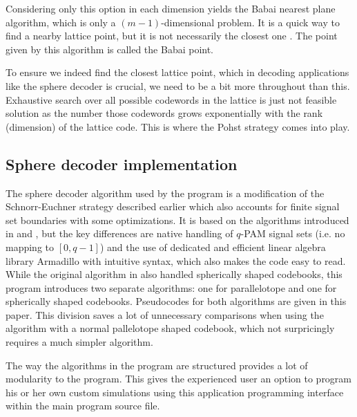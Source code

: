 \documentclass[english,12pt,a4paper,pdftex,sci,utf8]{aaltothesis}
\begin{document}
Considering only this option in each dimension yields the Babai nearest plane algorithm, which is only a $(m-1)$-dimensional problem. It is a quick way to find a nearby lattice point, but it is not necessarily the closest one \cite{agrell}. The point given by this algorithm is called the Babai point.
\par To ensure we indeed find the closest lattice point, which in decoding applications like the sphere decoder is crucial, we need to be a bit more throughout than this. Exhaustive search over all possible codewords in the lattice is just not feasible solution as the number those codewords grows exponentially with the rank (dimension) of the lattice code. This is where the Pohst strategy comes into play.

\subsection{Sphere decoder implementation}
The sphere decoder algorithm used by the program is a modification of the Schnorr-Euchner strategy described earlier which also accounts for finite signal set boundaries with some optimizations. It is based on the algorithms introduced in \cite{mia} and \cite{ranto}, but the key differences are native handling of $q$-PAM signal sets (i.e. no mapping to $[0,q-1]$) and the use of dedicated and efficient linear algebra library Armadillo \cite{arma} with intuitive syntax, which also makes the code easy to read. While the original algorithm in \cite{ranto} also handled spherically shaped codebooks, this program introduces two separate algorithms: one for parallelotope and one for spherically shaped codebooks. Pseudocodes for both algorithms are given in this paper. This division saves a lot of unnecessary comparisons when using the algorithm with a normal pallelotope shaped codebook, which not surpricingly requires a much simpler algorithm. 
\par The way the algorithms in the program are structured provides a lot of modularity to the program. This gives the experienced user an option to program his or her own custom simulations using this application programming interface within the main program source file. 
\end{document}
